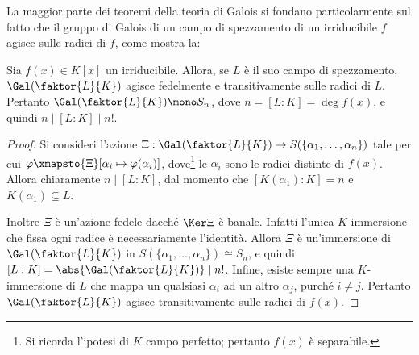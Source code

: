 \documentclass[12pt]{scrartcl}
\begin{document}
	La maggior parte dei teoremi della teoria di Galois si
	fondano particolarmente sul fatto che il gruppo di Galois
	di un campo di spezzamento di un irriducibile $f$
	agisce sulle radici di $f$, come mostra la:
	
	\begin{proposition}
		Sia $f(x) \in K[x]$ un irriducibile. Allora,
		se $L$ è il suo campo di spezzamento,
		$\Gal(\faktor{L}{K})$ agisce fedelmente e transitivamente sulle
		radici di $L$. Pertanto $\Gal(\faktor{L}{K}) \mono S_n$,
		dove $n = [L : K] = \deg f(x)$, e quindi
		$n \mid [L : K] \mid n!$. 
	\end{proposition}

	\begin{proof}
		Si consideri l'azione $\Xi : \Gal(\faktor{L}{K}) \to
		S(\{ \alpha_1, \ldots, \alpha_n \})$ tale per cui
		$\varphi \xmapsto{\Xi} [\alpha_i \mapsto \varphi(\alpha_i)]$, dove\footnote{
			Si ricorda l'ipotesi di $K$ campo perfetto;
			pertanto $f(x)$ è separabile.
		}
		le $\alpha_i$ sono le radici distinte di $f(x)$.
		Allora chiaramente $n \mid [L : K]$, dal momento
		che $[K(\alpha_1) : K] = n$ e $K(\alpha_1) \subseteq L$. \medskip
		
		
		Inoltre $\Xi$ è un'azione fedele dacché $\Ker \Xi$ è banale. Infatti
		l'unica $K$-immersione che fissa ogni radice è
		necessariamente
		l'identità. Allora $\Xi$ è un'immersione di
		$\Gal(\faktor{L}{K})$ in $S(\{ \alpha_1, \ldots, \alpha_n \}) \cong S_n$, e quindi
		$[L : K] = \abs{\Gal(\faktor{L}{K})} \mid n!$. Infine, esiste sempre una $K$-immersione di
		$L$ che mappa un qualsiasi $\alpha_i$ ad un altro
		$\alpha_j$, purché $i \neq j$. Pertanto $\Gal(\faktor{L}{K})$ agisce transitivamente sulle
		radici di $f(x)$.
	\end{proof}
\end{document}
